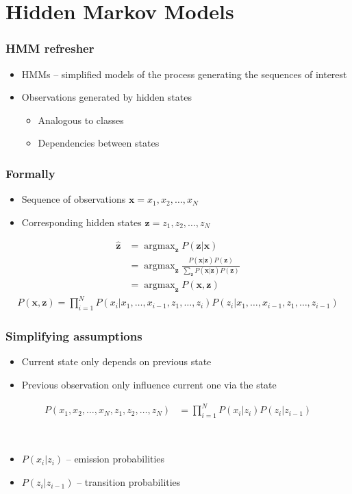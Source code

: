 \documentclass[usenames,dvipsnames]{beamer}
\DeclareMathOperator*{\argmax}{argmax}
\newcommand{\x}{\mathbf{x}}
\newcommand{\z}{\mathbf{z}}
\newcommand{\voc}[1]{{\color{ForestGreen}#1}}
\begin{document}
\section{Hidden Markov Models}

\begin{frame}
  \frametitle{HMM refresher}
  \begin{itemize}
  \item HMMs -- simplified models of the process generating the
    sequences of interest
  \item \voc{Observations} generated by \voc{hidden states} 
    \begin{itemize}
    \item Analogous to classes 
    \item Dependencies between states
    \end{itemize}
  \end{itemize}
\end{frame}

\begin{frame}
  \frametitle{Formally}
  \begin{itemize}
  \item Sequence of observations $\x = x_1,x_2,\ldots,x_N$
  \item Corresponding hidden states $\z = z_1,z_2,\ldots,z_N$
  \end{itemize}
  \begin{align*}
    \hat{\z} & = \argmax_{\z} P(\z|\x)\\
             & = \argmax_{\z}   \frac{P(\x|\z)P(\z)}{\sum_{\z} P(\x|\z)P(\z)}\\
             & = \argmax_{\z} P(\x,\z)
  \end{align*}
  \begin{align*}
     P(\x,\z) = \prod_{i=1}^N P(x_i|x_1,\ldots,x_{i-1},z_1,\ldots,z_{i})
                         P(z_i|x_1,\ldots,x_{i-1},z_1,\ldots,z_{i-1})
  \end{align*}
\end{frame}

\begin{frame}
  \frametitle{Simplifying assumptions}
  \begin{itemize}
  \item Current state only depends on previous state
  \item Previous observation only influence current one via the state
  \end{itemize}
  \begin{block}{}
    \begin{align*}
      P(x_1,x_2,\ldots,x_N,z_1,z_2,\ldots,z_N)
      & = \prod_{i=1}^N P(x_i|z_{i})P(z_i|z_{i-1})
    \end{align*}
  \end{block}
\
\begin{itemize}
\item $P(x_i|z_i)$ -- \voc{emission probabilities}
\item $P(z_i|z_{i-1})$ -- \voc{transition probabilities}
\end{itemize}
\end{frame}
\end{document}
